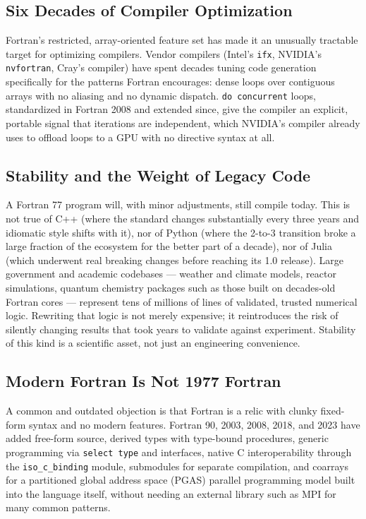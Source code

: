 \subsection{Six Decades of Compiler Optimization}

Fortran's restricted, array-oriented feature set has made it an unusually tractable target for optimizing compilers. Vendor compilers (Intel's \texttt{ifx}, NVIDIA's \texttt{nvfortran}, Cray's compiler) have spent decades tuning code generation specifically for the patterns Fortran encourages: dense loops over contiguous arrays with no aliasing and no dynamic dispatch. \texttt{do concurrent} loops, standardized in Fortran 2008 and extended since, give the compiler an explicit, portable signal that iterations are independent, which NVIDIA's compiler already uses to offload loops to a GPU with no directive syntax at all.

\subsection{Stability and the Weight of Legacy Code}

A Fortran 77 program will, with minor adjustments, still compile today. This is not true of C++ (where the standard changes substantially every three years and idiomatic style shifts with it), nor of Python (where the 2-to-3 transition broke a large fraction of the ecosystem for the better part of a decade), nor of Julia (which underwent real breaking changes before reaching its 1.0 release). Large government and academic codebases --- weather and climate models, reactor simulations, quantum chemistry packages such as those built on decades-old Fortran cores --- represent tens of millions of lines of validated, trusted numerical logic. Rewriting that logic is not merely expensive; it reintroduces the risk of silently changing results that took years to validate against experiment. Stability of this kind is a scientific asset, not just an engineering convenience.

\subsection{Modern Fortran Is Not 1977 Fortran}

A common and outdated objection is that Fortran is a relic with clunky fixed-form syntax and no modern features. Fortran 90, 2003, 2008, 2018, and 2023 have added free-form source, derived types with type-bound procedures, generic programming via \texttt{select type} and interfaces, native C interoperability through the \texttt{iso\_c\_binding} module, submodules for separate compilation, and coarrays for a partitioned global address space (PGAS) parallel programming model built into the language itself, without needing an external library such as MPI for many common patterns.


